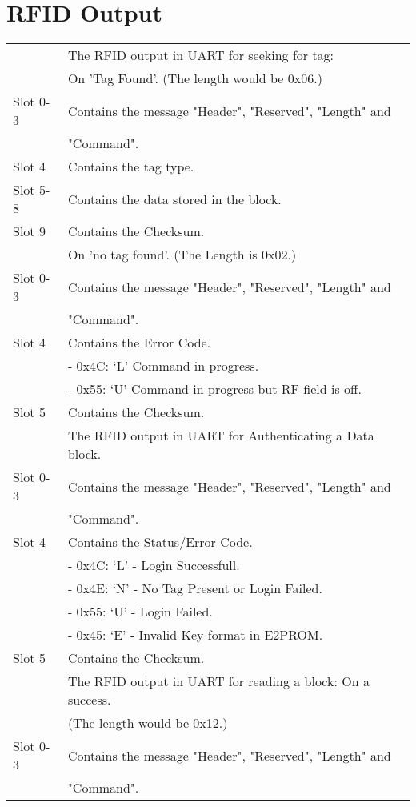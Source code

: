 \chapter{RFID Output}
\label{append:bytecode}
\begin{tabular}{|l|l|}
\hline
\hline
& The RFID output in UART for seeking for tag:\\
&  On 'Tag Found'. (The length would be 0x06.)\\
\hline
Slot 0-3 & Contains the message "Header", "Reserved", "Length" and\\
& "Command".\\
Slot 4 & Contains the tag type. \\
Slot 5-8 & Contains the data stored in the block.\\
Slot 9 & Contains the Checksum.\\
\hline
&On 'no tag found'. (The Length is 0x02.)\\
\hline
Slot 0-3 & Contains the message "Header", "Reserved", "Length" and\\
& "Command".\\
Slot 4 & Contains the Error Code.\\
& \indent - 0x4C: `L' Command in progress.\\
& \indent - 0x55: `U' Command in progress but RF field is off.\\
Slot 5 & Contains the Checksum.\\
\hline
\hline
&The RFID output in UART for Authenticating a Data block.\\
\hline
Slot 0-3 & Contains the message "Header", "Reserved", "Length" and\\
& "Command".\\
Slot 4 & Contains the Status/Error Code.\\
& \indent - 0x4C: `L' - Login Successfull.\\
& \indent - 0x4E: `N' - No Tag Present or Login Failed.\\
& \indent - 0x55: `U' - Login Failed.\\
& \indent - 0x45: `E' - Invalid Key format in E2PROM.\\
Slot 5 & Contains the Checksum.\\
\hline
\hline 
& The RFID output in UART for reading a block: On a success.\\
& (The length would be 0x12.) \\
\hline
Slot 0-3 & Contains the message "Header", "Reserved", "Length" and\\
& "Command".\\

\end{tabular}
